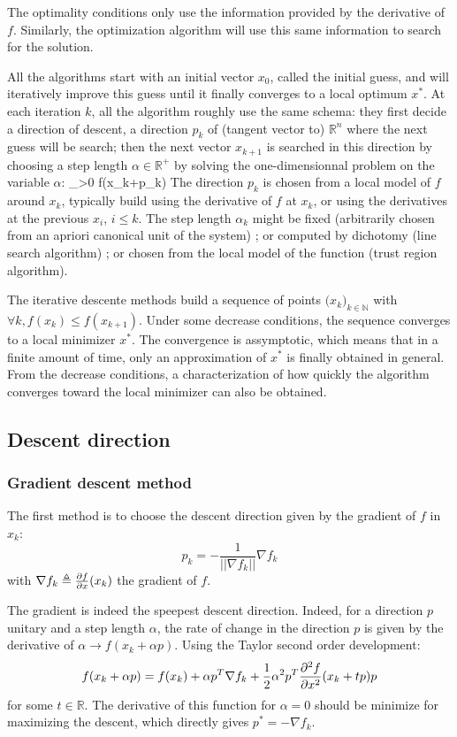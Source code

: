 \documentclass{book}
\begin{document}
The optimality conditions only use the information provided by the derivative of $f$. Similarly, the optimization algorithm will use this same information to search for the solution. 

All the algorithms start with an initial vector $x_0$, called the initial guess, and will iteratively improve this guess until it finally converges to a local optimum $x^*$. At each iteration $k$, all the algorithm roughly use the same schema: they first decide a direction of descent, \mie a direction $p_k$ of (tangent vector to) $\mathbb{R}^n$ where the next guess will be search; then the next vector $x_{k+1}$ is searched in this direction by choosing a step length $\alpha \in \mathbb{R}^+$ by solving the one-dimensionnal problem on the variable $\alpha$:
 \min_{\alpha>0} f(x_k+\alpha p_k) \EOUT
The direction $p_k$ is chosen from a local model of $f$ around $x_k$, typically build using the derivative of $f$ at $x_k$, or using the derivatives at the previous $x_i$, $i\le k$. The step length $\alpha_k$ might be fixed (arbitrarily chosen from an apriori canonical unit of the system) ; or computed by dichotomy (line search algorithm) ; or chosen from the local model of the function (trust region algorithm).

The  iterative descente methods build a sequence of points $\Big(x_k \Big)_{k\in\mathbb{N}}$ with $\forall k, f(x_k) \le f(x_{k+1})$. Under some decrease conditions, the sequence converges to a local minimizer $x^*$. The convergence is assymptotic, which means that in a finite amount of time, only an approximation of $x^*$ is finally obtained in general. From the decrease conditions, a characterization of how quickly the algorithm converges toward the local minimizer can also be obtained.

\subsection{Descent direction}

\subsubsection{Gradient descent method}

The first method is to choose the descent direction given by the gradient of $f$ in $x_k$:
\[ p_k = -\frac{1}{|| \nabla f_k||} \nabla f_k \] 
with $\nabla f_k \triangleq \frac{\partial{f}}{\partial{x}}(x_k)$ the gradient of $f$.

The gradient is indeed the speepest descent direction. Indeed, for a direction $p$ unitary and a step length $\alpha$, the rate of change in the direction $p$ is given  by the derivative of $\alpha \rightarrow f(x_k+\alpha p)$. Using the Taylor second order development:
\[ f(x_k +\alpha p) = f(x_k) + \alpha p^T \nabla f_k + \frac{1}{2} \alpha^2 p^T \frac{\partial^2{f}}{\partial{x}^2}(x_k+tp) p \]
for some $t\in\mathbb{R}$. The derivative of this function for $\alpha=0$ should be minimize for maximizing the descent, which directly gives $p^* = - \nabla f_k$.
\end{document}
